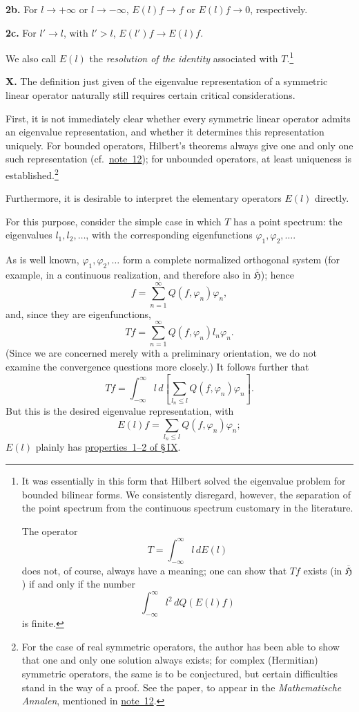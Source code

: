 \documentclass[fontsize=13pt,paper=b5,twoside,bookmarkpackage=false]{scrartcl}
\newcommand{\articleSection}[1]{%
  \par\addvspace{\medskipamount}\phantomsection\label{sec:#1}%
  \pdfbookmark[1]{Section #1}{section-#1}%
  \noindent\textbf{#1.}\enspace\ignorespaces}
\newcommand{\fnref}[1]{\hyperref[fn:#1]{note~#1}}
\begin{document}
\par\noindent{}\label{cond:IX:2b}\textbf{2b.}
For $l\to+\infty$ or $l\to-\infty$, $E(l)f\to f$ or $E(l)f\to0$, respectively.

\par\noindent{}\label{cond:IX:2c}\textbf{2c.}
For $l'\to l$, with $l'>l$, $E(l')f\to E(l)f$.

We also call $E(l)$ the \emph{resolution of the identity} associated with $T$.\footnote[26]{\label{fn:26}It was essentially in this form that Hilbert solved the eigenvalue problem for bounded bilinear forms. We consistently disregard, however, the separation of the point spectrum from the continuous spectrum customary in the literature.

The operator
\[
 T=\int_{-\infty}^{\infty}l\,dE(l)
\]
does not, of course, always have a meaning; one can show that $Tf$ exists (in $\overline{\mathfrak{H}}$) if and only if the number
\[
 \int_{-\infty}^{\infty}l^2\,dQ(E(l)f)
\]
is finite.}

\articleSection{X}
The definition just given of the eigenvalue representation of a symmetric linear operator naturally still requires certain critical considerations.

First, it is not immediately clear whether every symmetric linear operator admits an eigenvalue representation, and whether it determines this representation uniquely. For bounded operators, Hilbert's theorems always give one and only one such representation (cf.\ \fnref{12}); for unbounded operators, at least uniqueness is established.\footnote[27]{\label{fn:27}For the case of real symmetric operators, the author has been able to show that one and only one solution always exists; for complex (Hermitian) symmetric operators, the same is to be conjectured, but certain difficulties stand in the way of a proof. See the paper, to appear in the \emph{Mathematische Annalen}, mentioned in \fnref{12}.}

Furthermore, it is desirable to interpret the elementary operators $E(l)$ directly.

For this purpose, consider the simple case in which $T$ has a point spectrum: the eigenvalues $l_1,l_2,\ldots$, with the corresponding eigenfunctions $\varphi_1,\varphi_2,\ldots$.

As is well known, $\varphi_1,\varphi_2,\ldots$ form a complete normalized orthogonal system (for example, in a continuous realization, and therefore also in $\overline{\mathfrak{H}}$); hence
\[
 f=\sum_{n=1}^{\infty}Q(f,\varphi_n)\varphi_n,
\]
and, since they are eigenfunctions,
\[
 Tf=\sum_{n=1}^{\infty}Q(f,\varphi_n)l_n\varphi_n.
\]
(Since we are concerned merely with a preliminary orientation, we do not examine the convergence questions more closely.) It follows further that
\[
 Tf=\int_{-\infty}^{\infty}l\,d\left[\sum_{l_n\leq l}Q(f,\varphi_n)\varphi_n\right].
\]
But this is the desired eigenvalue representation, with
\label{eq:X:point-projection}
\[
 E(l)f=\sum_{l_n\leq l}Q(f,\varphi_n)\varphi_n;
\]
$E(l)$ plainly has \hyperref[cond:IX:1]{properties~1--2 of \S\,IX}.
\end{document}
